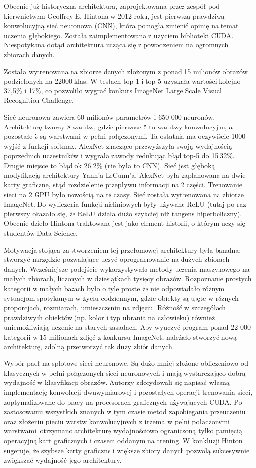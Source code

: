 \documentclass[12pt,a4paper,twoside,titlepage,openright]{book}
\begin{document}
\begin{itemize}
Obecnie już historyczna architektura, zaprojektowana przez zespół pod kierwnictwem Geoffrey E. Hintona w 2012 roku, jest pierwszą prawdziwą konwolucyjną sieć neuronowa (CNN), która pomogła zmienić opinię na temat uczenia głębokiego. Została zaimplementowana z użyciem biblioteki CUDA. Niespotykana dotąd architektura ucząca się z powodzeniem na ogromnych zbiorach danych.
 
 Została wytrenowana na zbiorze danych złożonym z ponad 15 milionów obrazów podzielonych na 22000 klas. 
 W testach top-1 i top-5 uzyskała wartości kolejno 37,5\% i 17\%, co pozwoliło wygrać konkurs ImageNet Large Scale Visual Recognition Challenge. 
 
 Sieć neuronowa zawiera 60 milionów parametrów i 650 000 neuronów. Architekturę tworzy 8 warstw, gdzie pierwsze 5 to warstwy konwolucyjne, a pozostałe 3 są warstwami w pełni połączonymi. Ta ostatnia ma oczywiście 1000 wyjść z funkcji softmax. AlexNet znacząco przewyższyła swoją wydajnością poprzednich uczestników i wygrała zawody redukując błąd top-5 do 15,32\%. Drugie miejsce to błąd ok 26.2\% (nie była to CNN). Sieć jest głęboką modyfikacją architektury Yann’a LeCunn’a. AlexNet była zaplanowana na dwie karty graficzne, stąd rozdzielenie przepływu informacji na 2 części. Trenowanie sieci na 2 GPU było nowością na te czasy. Sieć została wytrenowana na zbiorze ImageNet. Do wyliczenia funkcji nieliniowych były używane ReLU (tutaj po raz pierwszy okazało się, że ReLU działa dużo szybciej niż tangens hiperboliczny). Obecnie dzieło Hintona traktowane jest jako element historii, o którym uczy się studentów Data Science.
 
 Motywacja stojąca za stworzeniem tej przełomowej architektury była banalna: stworzyć narzędzie pozwalające uczyć oprogramowanie na dużych zbiorach danych.
 Wcześniejsze podejście wykorzystywało metody uczenia maszynowego na małych zbiorach, liczonych w dziesiątkach tysięcy obrazów. Rozpoznanie prostych kategorii w małych bazach było o tyle proste że nie odpowiadało różnym sytuacjom spotykanym w życiu codziennym, gdzie obiekty są ujęte w różnych proporcjach, rozmiarach, umieszczeniu na zdjęciu. Różność w szczegółach prawdziwych obiektów (np. kolor i typ ubrania na człowieku) również uniemożliwiają uczenie na starych zasadach. Aby wyuczyć program ponad 22 000 kategorii w 15 milionach zdjęć z konkursu ImageNet, należało stworzyć nową architekturę, zdolną przetworzyć tak duży zbiór danych.
 
 Wybór padł na splotowe sieci neuronowe. Są dużo mniej złożone obliczeniowo od klasycznych w pełni połączonych sieci neuronowych i mają wystarczająco dobrą wydajność w klasyfikacji obrazów. Autorzy zdecydowali się napisać własną implementację konwolucji dwuwymiarowej i pozostałych operacji trenowania sieci, zoptymalizowane do pracy na procesorach graficznych używających CUDA. Po zastosowaniu wszystkich znanych w tym czasie metod zapobiegania przeuczeniu oraz złożeniu pięciu warstw konwolucyjnych z trzema w pełni połączonymi warstwami, otrzymano architekturę wydajnościowo ograniczoną tylko pamięcią operacyjną kart graficznych i czasem oddanym na trening. W konkluzji Hinton sugeruje, że szybsze karty graficzne i większe zbiory danych pozwolą sukcesywnie zwiększać wydajność jego architektury.
 

\end{itemize}
\end{document}
